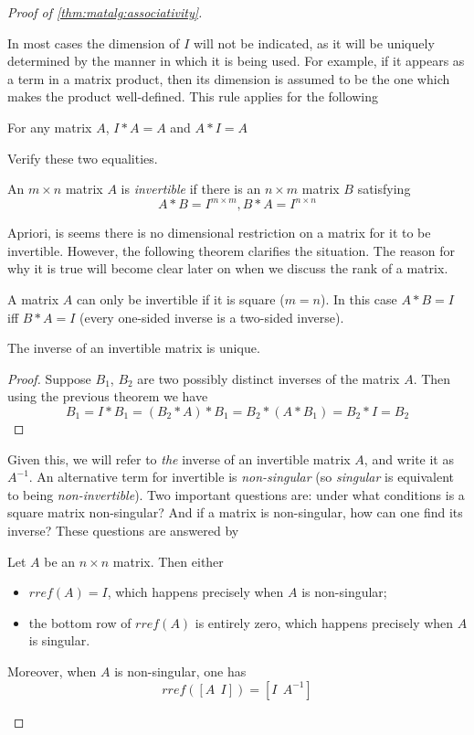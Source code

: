 \documentclass{ximera}
\begin{document}
\begin{proof}[Proof of \ref{thm:matalg:associativity}]
\begin{exercise}
In most cases the dimension of $I$ will not be indicated, as it will be uniquely determined by the manner in which it is being used. For example, if it appears as a term in a matrix product, then its dimension is assumed to be the one which makes the product well-defined. This rule applies for the following 

\begin{proposition} For any matrix $A$, $I*A = A$ and $A*I = A$
\end{proposition}

\begin{exercise} Verify these two equalities.
\end{exercise}

\begin{definition} An $m\times n$ matrix $A$ is {\it invertible} if there is an $n\times m$ matrix $B$ satisfying
\[
A*B = I^{m\times m}, B*A = I^{n\times n}
\]
\end{definition}

Apriori, is seems there is no dimensional restriction on a matrix for it to be invertible. However, the following theorem clarifies the situation. The reason for why it is true will become clear later on when we discuss the rank of a matrix.

\begin{theorem} A matrix $A$ can only be invertible if it is square ($m = n$). In this case $A*B =I$ iff $B*A = I$ (every one-sided inverse is a two-sided inverse).
\end{theorem}

\begin{proposition} The inverse of an invertible matrix is unique.
\end{proposition}

\begin{proof} Suppose $B_1$, $B_2$ are two possibly distinct inverses of the matrix $A$. Then using the previous theorem we have
\[
B_1 = I*B_1 = (B_2*A)*B_1 = B_2*(A*B_1) = B_2*I = B_2
\]
\end{proof}

Given this, we will refer to {\it the} inverse of an invertible matrix $A$, and write it as $A^{-1}$. An alternative term for invertible is {\it non-singular} (so {\it singular} is equivalent to being  {\it non-invertible}). Two important questions are: under what conditions is a square matrix non-singular? And if a matrix is non-singular, how can one find its inverse? These questions are answered by 

\begin{theorem} Let $A$ be an $n\times n$ matrix. Then either
\begin{itemize}
\item $rref(A) = I$, which happens precisely when $A$ is non-singular;
\item the bottom row of $rref(A)$ is entirely zero, which happens precisely when $A$ is singular.
\end{itemize}
Moreover, when $A$ is non-singular, one has
\[
rref([A\ \ I]) = [I\ \ A^{-1}]
\]
\end{theorem}


\end{exercise}
\end{proof}
\end{document}
